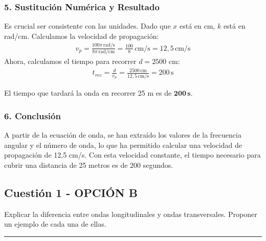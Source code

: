 \subsubsection*{5. Sustitución Numérica y Resultado}
Es crucial ser consistente con las unidades. Dado que $x$ está en cm, $k$ está en rad/cm.
Calculamos la velocidad de propagación:
\begin{gather}
    v_p = \frac{100\pi \, \text{rad/s}}{8\pi \, \text{rad/cm}} = \frac{100}{8} \, \text{cm/s} = 12,5 \, \text{cm/s}
\end{gather}
Ahora, calculamos el tiempo para recorrer $d = 2500$ cm:
\begin{gather}
    t_{rec} = \frac{d}{v_p} = \frac{2500 \, \text{cm}}{12,5 \, \text{cm/s}} = 200 \, \text{s}
\end{gather}
\begin{cajaresultado}
    El tiempo que tardará la onda en recorrer 25 m es de $\boldsymbol{200 \, \textbf{s}}$.
\end{cajaresultado}

\subsubsection*{6. Conclusión}
\begin{cajaconclusion}
A partir de la ecuación de onda, se han extraído los valores de la frecuencia angular y el número de onda, lo que ha permitido calcular una velocidad de propagación de 12,5 cm/s. Con esta velocidad constante, el tiempo necesario para cubrir una distancia de 25 metros es de 200 segundos.
\end{cajaconclusion}

\newpage

\subsection{Cuestión 1 - OPCIÓN B}
\label{subsec:2B_2001_jun_ord}

\begin{cajaenunciado}
Explicar la diferencia entre ondas longitudinales y ondas transversales. Proponer un ejemplo de cada una de ellas.
\end{cajaenunciado}
\hrule

